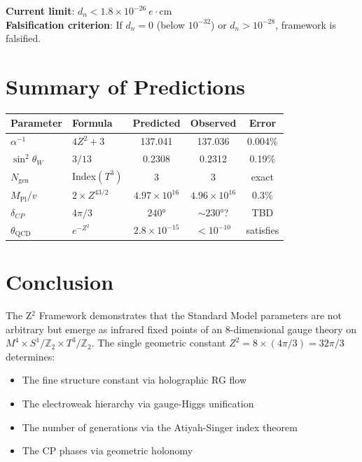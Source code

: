 \documentclass[12pt,a4paper]{article}
\begin{document}
\textbf{Current limit}: $d_n < 1.8 \times 10^{-26}~e\cdot\text{cm}$\\
\textbf{Falsification criterion}: If $d_n = 0$ (below $10^{-32}$) or $d_n > 10^{-28}$, framework is falsified.

\section{Summary of Predictions}

\begin{center}
\begin{tabular}{l|l|c|c|c}
\textbf{Parameter} & \textbf{Formula} & \textbf{Predicted} & \textbf{Observed} & \textbf{Error} \\\hline
$\alpha^{-1}$ & $4Z^2 + 3$ & 137.041 & 137.036 & 0.004\% \\
$\sin^2\theta_W$ & $3/13$ & 0.2308 & 0.2312 & 0.19\% \\
$N_{\text{gen}}$ & Index$(T^3)$ & 3 & 3 & exact \\
$M_{\text{Pl}}/v$ & $2 \times Z^{43/2}$ & $4.97\times10^{16}$ & $4.96\times10^{16}$ & 0.3\% \\
$\delta_{CP}$ & $4\pi/3$ & $240°$ & $\sim 230°$? & TBD \\
$\theta_{\text{QCD}}$ & $e^{-Z^2}$ & $2.8\times10^{-15}$ & $< 10^{-10}$ & satisfies
\end{tabular}
\end{center}

\section{Conclusion}

The Z$^2$ Framework demonstrates that the Standard Model parameters are not arbitrary but emerge as infrared fixed points of an 8-dimensional gauge theory on $M^4 \times S^1/\mathbb{Z}_2 \times T^3/\mathbb{Z}_2$. The single geometric constant $Z^2 = 8 \times (4\pi/3) = 32\pi/3$ determines:

\begin{itemize}
    \item The fine structure constant via holographic RG flow
    \item The electroweak hierarchy via gauge-Higgs unification
    \item The number of generations via the Atiyah-Singer index theorem
    \item The CP phases via geometric holonomy
\end{itemize}
\end{document}

